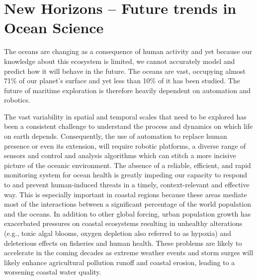 \section{New Horizons -- Future trends in Ocean Science}
\label{sec:future}

The oceans are changing as a consequence of human activity and yet
because our knowledge about this ecosystem is limited, we cannot
accurately model and predict how it will behave in the future.  The
oceans are vast, occupying almost 71\% of our planet’s surface and yet
less than 10\% of it has been studied. The future of maritime
exploration is therefore heavily dependent on automation and robotics.

The vast variability in spatial and temporal scales that need to be
explored has been a consistent challenge to understand the process and
dynamics on which life on earth depends. Consequently, the use of
automation to replace human presence or even its extension, will
require robotic platforms, a diverse range of sensors and control and
analysis algorithms which can stitch a more incisive picture of the
oceanic environment.
The absence of a reliable, efficient, and rapid monitoring system for
ocean health is greatly impeding our capacity to respond to and
prevent human-induced threats in a timely, context-relevant and
effective way. This is especially important in coastal regions because
these areas mediate most of the interactions between a significant
percentage of the world population and the oceans.  In addition to
other global forcing, urban population growth has exacerbated
pressures on coastal ecosystems resulting in unhealthy alterations
(e.g., toxic algal blooms, oxygen depletion also referred to as
hypoxia) and deleterious effects on fisheries and human health. These
problems are likely to accelerate in the coming decades as extreme
weather events and storm surges will likely enhance agricultural
pollution runoff and coastal erosion, leading to a worsening coastal
water quality.

